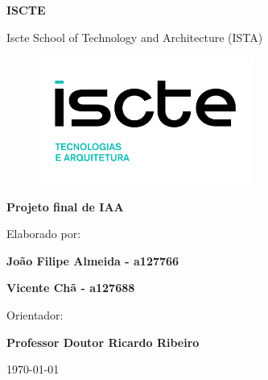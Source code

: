 \thispagestyle{empty}
\setcounter{page}{-1}

\begin{center}
\begin{Huge}
\textbf{ISCTE}
\end{Huge}
\end{center}

\begin{center}
\begin{Huge}
Iscte School of Technology and Architecture (ISTA)
\end{Huge}
\end{center}

\vspace{0,07cm}
\begin{figure}[!htb]
\centering
\includegraphics[width=200pt]{ISCTE_ISTA.png}
\end{figure}

\vspace{0.5cm}
\begin{center}
\begin{Large}
\textbf{Projeto final de IAA}
\end{Large}
\end{center}


\vspace{0.5cm}
\begin{center}
\begin{normalsize}
\begin{large}
Elaborado por:
\end{large}
\end{normalsize}
\end{center}

\vspace{0.2cm}
\begin{center}
\begin{large}
\textbf{João Filipe Almeida - a127766}

\textbf{Vicente Chã - a127688}
\end{large}
\end{center}

\vspace{0,5cm}
\begin{center}
\begin{normalsize}
\begin{large}
Orientador:
\end{large}
\end{normalsize}
\end{center}

\vspace{0.2cm}
\begin{center}
\begin{large}
\textbf{Professor Doutor Ricardo Ribeiro}
\end{large}
\end{center}



\vspace{0.5cm}
\begin{center}
\begin{normalsize}
\today
\end{normalsize}
\end{center}

